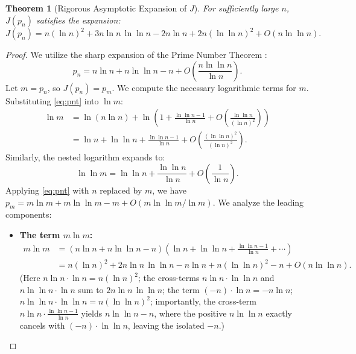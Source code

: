 \documentclass[11pt, a4paper]{article}
\newtheorem{theorem}{Theorem}
\begin{document}
\begin{theorem}[Rigorous Asymptotic Expansion of $J$]\label{thm:asymp}
For sufficiently large $n$, $J(p_n)$ satisfies the expansion:
\begin{equation}\label{eq:asymp}
J(p_n) = n(\ln n)^2 + 3n \ln n \,\ln \ln n - 2n \ln n + 2n(\ln \ln n)^2 + O(n \ln \ln n).
\end{equation}
\end{theorem}
\begin{proof}
We utilize the sharp expansion of the Prime Number Theorem \cite{dusart}:
\begin{equation}\label{eq:pnt}
p_n = n \ln n + n \ln \ln n - n + O\!\left(\frac{n \ln \ln n}{\ln n}\right).
\end{equation}
Let $m = p_n$, so $J(p_n) = p_m$. We compute the necessary logarithmic terms for $m$.
Substituting \eqref{eq:pnt} into $\ln m$:
\begin{align}
\ln m &= \ln(n \ln n) + \ln\!\left(1 + \frac{\ln \ln n - 1}{\ln n} + O\!\left(\frac{\ln \ln n}{(\ln n)^2}\right)\right) \nonumber \\
&= \ln n + \ln \ln n + \frac{\ln \ln n - 1}{\ln n} + O\!\left(\frac{(\ln \ln n)^2}{(\ln n)^2}\right). \label{eq:lnm}
\end{align}
Similarly, the nested logarithm expands to:
\begin{equation}\label{eq:lnlnm}
\ln \ln m = \ln \ln n + \frac{\ln \ln n}{\ln n} + O\!\left(\frac{1}{\ln n}\right).
\end{equation}
Applying \eqref{eq:pnt} with $n$ replaced by $m$, we have $p_m = m \ln m + m \ln \ln m - m + O(m \ln \ln m / \ln m)$. We analyze the leading components:
\begin{itemize}
\item \textbf{The term $m \ln m$:}
\begin{align*}
m \ln m &= (n \ln n + n \ln \ln n - n) \left(\ln n + \ln \ln n + \frac{\ln \ln n - 1}{\ln n} + \cdots \right) \\
&= n(\ln n)^2 + 2n \ln n \,\ln \ln n - n \ln n + n(\ln \ln n)^2 - n + O(n \ln \ln n).
\end{align*}
(Here $n \ln n \cdot \ln n = n(\ln n)^2$; the cross-terms $n \ln n \cdot \ln \ln n$ and $n \ln \ln n \cdot \ln n$ sum to $2n \ln n \,\ln \ln n$; the term $(-n) \cdot \ln n = -n \ln n$; $n \ln \ln n \cdot \ln \ln n = n(\ln \ln n)^2$; importantly, the cross-term $n \ln n \cdot \frac{\ln \ln n - 1}{\ln n}$ yields $n \ln \ln n - n$, where the positive $n \ln \ln n$ exactly cancels with $(-n) \cdot \ln \ln n$, leaving the isolated $-n$.)


\end{itemize}
\end{proof}
\end{document}
